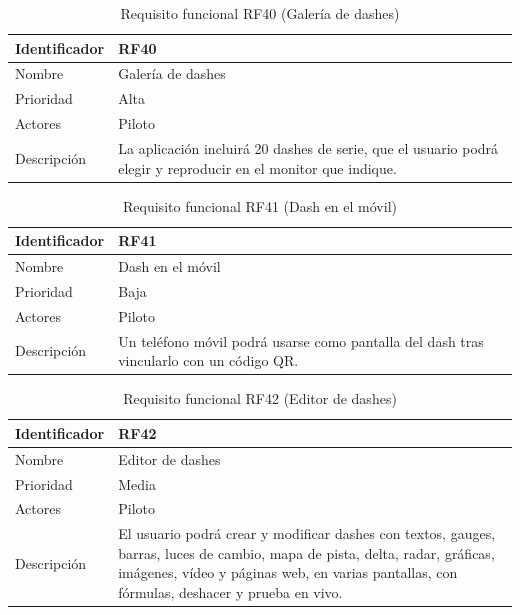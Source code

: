 \begin{table}[H]
	\centering
	\renewcommand{\arraystretch}{2}
	\begin{tabular}{|l|p{10cm}|}
		\hline
		Identificador & RF40 \\
		\hline
		Nombre & Galería de dashes \\
		\hline
		Prioridad & Alta \\
		\hline
		Actores & Piloto \\
		\hline
		Descripción & La aplicación incluirá 20 dashes de serie, que el usuario podrá elegir y reproducir en el monitor que indique. \\
		\hline
	\end{tabular}
	\caption{Requisito funcional RF40 (Galería de dashes)}
	\label{tab:rf40}
\end{table}

\begin{table}[H]
	\centering
	\renewcommand{\arraystretch}{2}
	\begin{tabular}{|l|p{10cm}|}
		\hline
		Identificador & RF41 \\
		\hline
		Nombre & Dash en el móvil \\
		\hline
		Prioridad & Baja \\
		\hline
		Actores & Piloto \\
		\hline
		Descripción & Un teléfono móvil podrá usarse como pantalla del dash tras vincularlo con un código QR. \\
		\hline
	\end{tabular}
	\caption{Requisito funcional RF41 (Dash en el móvil)}
	\label{tab:rf41}
\end{table}

\begin{table}[H]
	\centering
	\renewcommand{\arraystretch}{2}
	\begin{tabular}{|l|p{10cm}|}
		\hline
		Identificador & RF42 \\
		\hline
		Nombre & Editor de dashes \\
		\hline
		Prioridad & Media \\
		\hline
		Actores & Piloto \\
		\hline
		Descripción & El usuario podrá crear y modificar dashes con textos, gauges, barras, luces de cambio, mapa de pista, delta, radar, gráficas, imágenes, vídeo y páginas web, en varias pantallas, con fórmulas, deshacer y prueba en vivo. \\
		\hline
	\end{tabular}
	\caption{Requisito funcional RF42 (Editor de dashes)}
	\label{tab:rf42}
\end{table}

